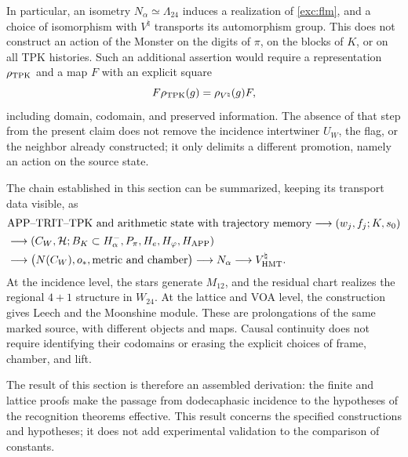 \par
In particular, an isometry $N_\alpha\simeq\Lambda_{24}$ induces
a realization of \eqref{exc:flm}, and a choice of isomorphism
with $V^\natural$ transports its automorphism group. This does not
construct an action of the Monster on the digits of
$\pi$, on the blocks of $K$, or on all TPK histories.
Such an additional assertion would require a representation
$\rho_{\rm TPK}$ and a map $F$ with an explicit square
\[
 F\rho_{\rm TPK}(g)=\rho_{V^\natural}(g)F,
\]
including domain, codomain, and preserved information. The absence
of that step from the present claim does not remove the incidence
intertwiner $U_W$, the flag, or the neighbor already constructed; it only
delimits a different promotion, namely an action on the source state.

The chain established in this section can be summarized, keeping
its transport data visible, as
\begin{align*}
 &\text{APP--TRIT--TPK and arithmetic state with trajectory memory}
   \longrightarrow (w_j,f_j;K,s_0)\\
 &\longrightarrow (C_W,\mathcal H;B_K\subset H^-_\alpha,
                   P_\pi,H_e,H_\varphi,H_{\rm APP})\\
 &\longrightarrow \bigl(N(C_W),o_*,\text{metric and chamber}\bigr)
   \longrightarrow N_\alpha
   \longrightarrow V^\natural_{\rm HMT}.
\end{align*}
At the incidence level, the stars generate $M_{12}$, and the
residual chart realizes the regional $4+1$ structure in $W_{24}$.
At the lattice and VOA level, the construction gives Leech and the
Moonshine module. These are prolongations of the same marked source, with
different objects and maps. Causal continuity does not require
identifying their codomains or erasing the explicit choices
of frame, chamber, and lift.

The result of this section is therefore an assembled derivation:
the finite and lattice proofs make the passage from dodecaphasic
incidence to the hypotheses of the recognition theorems effective.
This result concerns the specified constructions and hypotheses;
it does not add experimental validation to the comparison of constants.
